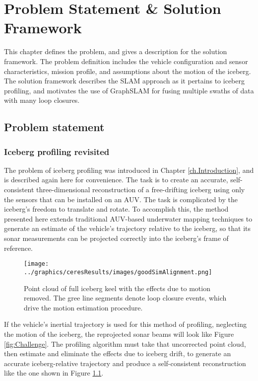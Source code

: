 
\chapter{Problem Statement \& Solution Framework}
\label{ch.ProblemStatement}

This chapter defines the problem, and gives a description for the solution framework. The problem definition includes the vehicle configuration and sensor characteristics, mission profile, and assumptions about the motion of the iceberg. The solution framework describes the SLAM approach as it pertains to iceberg profiling, and motivates the use of GraphSLAM for fusing multiple swaths of data with many loop closures. 

\section{Problem statement}

\subsection{Iceberg profiling revisited}

The problem of iceberg profiling was introduced in Chapter \ref{ch.Introduction}, and is described again here for convenience. The task is to create an accurate, self-consistent three-dimensional reconstruction of a free-drifting iceberg using only the sensors that can be installed on an AUV. The task is complicated by the iceberg's freedom to translate and rotate. To accomplish this, the method presented here extends traditional AUV-based underwater mapping techniques to generate an estimate of the vehicle's trajectory relative to the iceberg, so that its sonar measurements can be projected correctly into the iceberg's frame of reference. 

\begin{figure}[htb]
   \centering
   \texttt{[image: ../graphics/ceresResults/images/goodSimAlignment.png]} %
   \caption{Point cloud of full iceberg keel with the effects due to motion removed. The gree line segments denote loop closure events, which drive the motion estimation procedure. }
   \label{fig:SOLUTION}
\end{figure}

If the vehicle's inertial trajectory is used for this method of profiling, neglecting the motion of the iceberg, the reprojected sonar beams will look like Figure \ref{fig:Challenge}. The profiling algorithm must take that uncorrected point cloud, then estimate and eliminate the effects due to iceberg drift, to generate an accurate iceberg-relative trajectory and produce a self-consistent reconstruction like the one shown in Figure \ref{fig:SOLUTION}.


